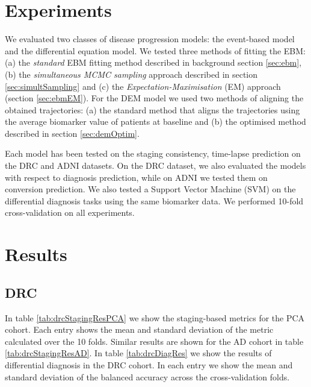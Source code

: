 \section{Experiments}

We evaluated two classes of disease progression models: the event-based model and the differential equation model. We tested three methods of fitting the EBM: (a) the \emph{standard} EBM fitting method described in background section \ref{sec:ebm}, (b) the \emph{simultaneous MCMC sampling} approach described in section \ref{sec:simultSampling} and (c) the \emph{Expectation-Maximisation} (EM) approach (section \ref{sec:ebmEM}). For the DEM model we used two methods of aligning the obtained trajectories: (a) the standard method that aligns the trajectories using the average biomarker value of patients at baseline and (b) the optimised method described in section \ref{sec:demOptim}. 

Each model has been tested on the staging consistency, time-lapse prediction on the DRC and ADNI datasets. On the DRC dataset, we also evaluated the models with respect to diagnosis prediction, while on ADNI we tested them on conversion prediction. We also tested a Support Vector Machine (SVM) on the differential diagnosis tasks using the same biomarker data. We performed 10-fold cross-validation on all experiments. 

\section{Results}
\label{sec:perfResults}

\subsection{DRC}
\label{sec:perfDRCresults}

In table \ref{tab:drcStagingResPCA} we show the staging-based metrics for the PCA cohort. Each entry shows the mean and standard deviation of the metric calculated over the 10 folds. Similar results are shown for the AD cohort in table \ref{tab:drcStagingResAD}. In table \ref{tab:drcDiagRes} we show the results of differential diagnosis in the DRC cohort. In each entry we show the mean and standard deviation of the balanced accuracy across the cross-validation folds.

